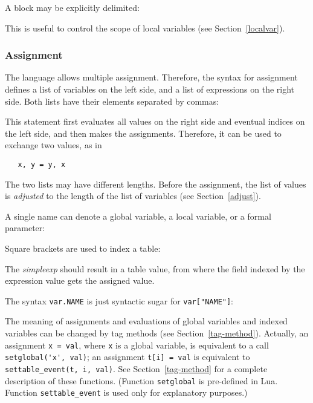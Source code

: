 \documentclass[11pt]{article}
\newcommand{\See}[1]{Section~\ref{#1}}
\newcommand{\see}[1]{(see \See{#1})}
\newcommand{\M}[1]{\emph{#1}}
\newcommand{\T}[1]{{\tt #1}}
\newcommand{\Index}[1]{#1\index{#1}}
\begin{document}
A block may be explicitly delimited:
\begin{Produc}
\end{Produc}%
This is useful to control the scope of local variables \see{localvar}.

\subsubsection{\Index{Assignment}} \label{assignment}
The language allows \Index{multiple assignment}.
Therefore, the syntax for assignment
defines a list of variables on the left side,
and a list of expressions on the right side.
Both lists have their elements separated by commas:
\begin{Produc}
\end{Produc}%
This statement first evaluates all values on the right side
and eventual indices on the left side,
and then makes the assignments.
Therefore, it can be used to exchange two values, as in
\begin{verbatim}
   x, y = y, x
\end{verbatim}
The two lists may have different lengths.
Before the assignment, the list of values is \emph{adjusted} to
the length of the list of variables \see{adjust}.

A single name can denote a global variable, a local variable,
or a formal parameter:
\begin{Produc}
\end{Produc}%
Square brackets are used to index a table:
\begin{Produc}
\end{Produc}%
The \M{simpleexp} should result in a table value,
from where the field indexed by the expression
value gets the assigned value.

The syntax \verb|var.NAME| is just syntactic sugar for
\verb|var["NAME"]|:
\begin{Produc}
\end{Produc}%

The meaning of assignments and evaluations of global variables and
indexed variables can be changed by tag methods \see{tag-method}.
Actually,
an assignment \verb|x = val|, where \verb|x| is a global variable,
is equivalent to a call \verb|setglobal('x', val)|;
an assignment \verb|t[i] = val| is equivalent to
\verb|settable_event(t, i, val)|.
See \See{tag-method} for a complete description of these functions.
(Function \verb|setglobal| is pre-defined in Lua.
Function \T{settable\_event} is used only for explanatory purposes.)
\end{document}
